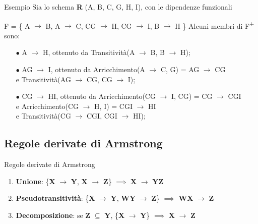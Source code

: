\documentclass{beamer}
\begin{document}
    

\begin{frame}{Esempio}
    Sia lo schema \textbf{R} (A, B, C, G, H, I), con le dipendenze funzionali\par
    F = 
    \{
        A $\rightarrow$ B,
        A $\rightarrow$ C,
        CG $\rightarrow$ H,
        CG $\rightarrow$ I,
        B $\rightarrow$ H
    \}
    Alcuni membri di F\textsuperscript{+} sono:
    \begin{itemize}
        \item[$\bullet$] A $\rightarrow$ H, ottenuto da Transitività(A $\rightarrow$ B, B $\rightarrow$ H);
        \item[$\bullet$] AG $\rightarrow$ I, ottenuto da Arricchimento(A $\rightarrow$ C, G) = AG $\rightarrow$ CG
        \\ \hspace{3cm} e Transitività(AG $\rightarrow$ CG, CG $\rightarrow$ I);
        \item[$\bullet$] CG $\rightarrow$ HI, ottenuto da Arricchimento(CG $\rightarrow$ I, CG) = CG $\rightarrow$ CGI
        \\ \hspace{3cm} e Arricchimento(CG $\rightarrow$ H, I) = CGI $\rightarrow$ HI
        \\ \hspace{3cm} e Transitività(CG $\rightarrow$ CGI, CGI $\rightarrow$ HI);
    \end{itemize}
\end{frame}

\subsection{Regole derivate di Armstrong}
\begin{frame}{Regole derivate di Armstrong}
    \begin{enumerate}
    \item \textbf{Unione}: \{\textbf{X} $\rightarrow$ \textbf{Y}, \textbf{X} $\rightarrow$ \textbf{Z}\} $\implies$ \textbf{X} $\rightarrow$ \textbf{YZ}
    \item \textbf{Pseudotransitività}: \{\textbf{X} $\rightarrow$ \textbf{Y}, \textbf{WY} $\rightarrow$ \textbf{Z}\} $\implies$ \textbf{WX} $\rightarrow$ \textbf{Z}
    \item \textbf{Decomposizione}: se \textbf{Z} $\subseteq$ \textbf{Y}, \{\textbf{X} $\rightarrow$ \textbf{Y}\} $\implies$ \textbf{X} $\rightarrow$ \textbf{Z}
    \end{enumerate}
\end{frame}
\end{document}
